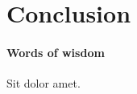 \documentclass[paper.tex]{subfiles}
\begin{document}
\section{Conclusion}\label{s:conclusion}

\paragraph{Words of wisdom} Sit dolor amet.
\end{document}
